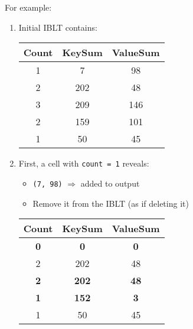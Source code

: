 \noindent
For example:
\begin{enumerate}
    \item Initial IBLT contains:
    \begin{table}[!htp]
        \centering
        \begin{tabular}{@{} c c c @{}}
            \toprule
            Count   & KeySum    & ValueSum  \\
            \midrule
            1       & 7         & 98        \\
            2       & 202       & 48        \\
            3       & 209       & 146       \\
            2       & 159       & 101       \\
            1       & 50        & 45        \\
            \bottomrule
        \end{tabular}
    \end{table}

    \item First, a cell with \texttt{count = 1} reveals:
    \begin{itemize}
        \item \texttt{(7, 98)} $\Rightarrow$ added to output
        \item Remove it from the IBLT (as if deleting it)
    \end{itemize}
    \begin{table}[!htp]
        \centering
        \begin{tabular}{@{} c c c @{}}
            \toprule
            Count   & KeySum    & ValueSum  \\
            \midrule
            \textbf{0}       & \textbf{0}         & \textbf{0}         \\
            2       & 202       & 48        \\
            \textbf{2}       & \textbf{202}       & \textbf{48}        \\
            \textbf{1}       & \textbf{152}       & \textbf{3}         \\
            1       & 50        & 45        \\
            \bottomrule
        \end{tabular}
    \end{table}


\end{enumerate}
